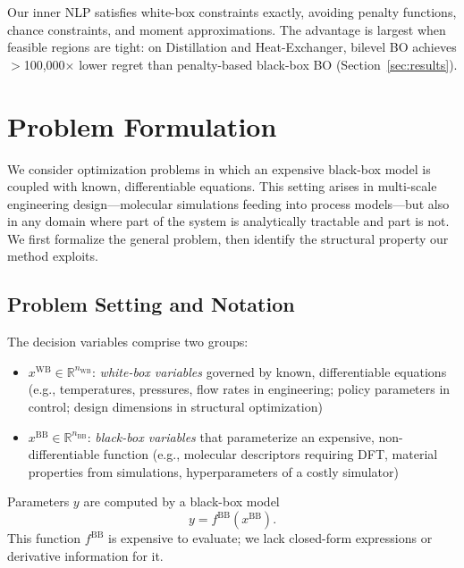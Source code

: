 \documentclass[12pt,a4paper]{article}%
\theoremstyle{plain}%
\theoremstyle{remark}%
\theoremstyle{definition}%
\def\WB{\mathrm{WB}}
\def\BB{\mathrm{BB}}
\begin{document}
Our inner NLP satisfies white-box constraints exactly, avoiding penalty functions, chance constraints, and moment approximations. The advantage is largest when feasible regions are tight: on Distillation and Heat-Exchanger, bilevel BO achieves $>$100{,}000$\times$ lower regret than penalty-based black-box BO (Section~\ref{sec:results}).

\section{Problem Formulation}\label{sec:problem_formulation}

We consider optimization problems in which an expensive black-box model is coupled with known, differentiable equations. This setting arises in multi-scale engineering design---molecular simulations feeding into process models---but also in any domain where part of the system is analytically tractable and part is not. We first formalize the general problem, then identify the structural property our method exploits.

\subsection{Problem Setting and Notation}\label{subsec:problem_setting}

The decision variables comprise two groups:
\begin{itemize}
    \item $x^{\WB} \in \mathbb{R}^{n_{\WB}}$: \emph{white-box variables} governed by known, differentiable equations (e.g., temperatures, pressures, flow rates in engineering; policy parameters in control; design dimensions in structural optimization)
    \item $x^{\BB} \in \mathbb{R}^{n_{\BB}}$: \emph{black-box variables} that parameterize an expensive, non-differentiable function (e.g., molecular descriptors requiring DFT, material properties from simulations, hyperparameters of a costly simulator)
\end{itemize}

Parameters $y$ are computed by a black-box model
\begin{equation}\label{eq:molecular_model}
    y = f^{\BB}(x^{\BB}).
\end{equation}
This function $f^{\BB}$ is expensive to evaluate; we lack closed-form expressions or derivative information for it.
\end{document}
